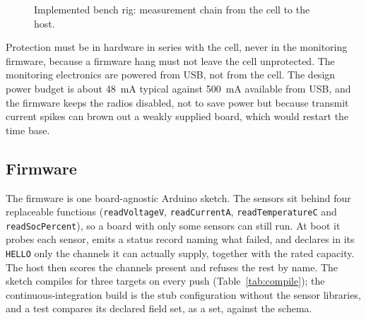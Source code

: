 \documentclass[12pt,a4paper]{amritareport}
\begin{document}
\begin{figure}[htbp]
    \centering
    \caption{Implemented bench rig: measurement chain from the cell to the host.}
    \label{fig:rig}
\end{figure}

Protection must be in hardware in series with the cell, never in the monitoring firmware, because a firmware hang must not leave the cell unprotected. The monitoring electronics are powered from USB, not from the cell. The design power budget is about 48~mA typical against 500~mA available from USB, and the firmware keeps the radios disabled, not to save power but because transmit current spikes can brown out a weakly supplied board, which would restart the time base.

\subsection{Firmware}

The firmware is one board-agnostic Arduino sketch. The sensors sit behind four replaceable functions (\texttt{readVoltageV}, \texttt{readCurrentA}, \texttt{readTemperatureC} and \texttt{readSocPercent}), so a board with only some sensors can still run. At boot it probes each sensor, emits a status record naming what failed, and declares in its \texttt{HELLO} only the channels it can actually supply, together with the rated capacity. The host then scores the channels present and refuses the rest by name. The sketch compiles for three targets on every push (Table~\ref{tab:compile}); the continuous-integration build is the stub configuration without the sensor libraries, and a test compares its declared field set, as a set, against the schema.
\end{document}
